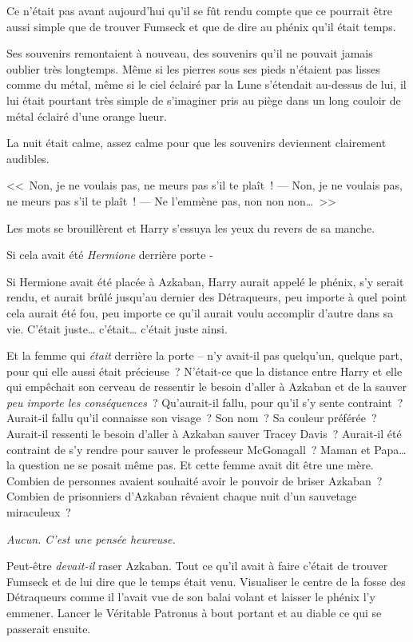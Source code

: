 Ce n'était pas avant aujourd'hui qu'il se fût rendu compte que ce pourrait être aussi simple que de trouver Fumseck et que de dire au phénix qu'il était temps.

Ses souvenirs remontaient à nouveau, des souvenirs qu'il ne pouvait jamais oublier très longtemps. Même si les pierres sous ses pieds n'étaient pas lisses comme du métal, même si le ciel éclairé par la Lune s'étendait au-dessus de lui, il lui était pourtant très simple de s'imaginer pris au piège dans un long couloir de métal éclairé d'une orange lueur.

La nuit était calme, assez calme pour que les souvenirs deviennent clairement audibles.

<<~Non, je ne voulais pas, ne meurs pas s'il te plaît~!
---  Non, je ne voulais pas, ne meurs pas s'il te plaît~!
---  Ne l'emmène pas, non non non…~>>

Les mots se brouillèrent et Harry s'essuya les yeux du revers de sa manche.

Si cela avait été \emph{Hermione} derrière porte -

Si Hermione avait été placée à Azkaban, Harry aurait appelé le phénix, s'y serait rendu, et aurait brûlé jusqu'au dernier des Détraqueurs, peu importe à quel point cela aurait été fou, peu importe ce qu'il aurait voulu accomplir d'autre dans sa vie. C'était juste… c'était… c'était juste ainsi.

Et la femme qui \emph{était} derrière la porte -- n'y avait-il pas quelqu'un, quelque part, pour qui elle aussi était précieuse~? N'était-ce que la distance entre Harry et elle qui empêchait son cerveau de ressentir le besoin d'aller à Azkaban et de la sauver \emph{peu importe les conséquences}~? Qu'aurait-il fallu, pour qu'il s'y sente contraint~? Aurait-il fallu qu'il connaisse son visage~? Son nom~? Sa couleur préférée~? Aurait-il ressenti le besoin d'aller à Azkaban sauver Tracey Davis~? Aurait-il été contraint de s'y rendre pour sauver le professeur McGonagall~? Maman et Papa… la question ne se posait même pas. Et cette femme avait dit être une mère. Combien de personnes avaient souhaité avoir le pouvoir de briser Azkaban~? Combien de prisonniers d'Azkaban rêvaient chaque nuit d'un sauvetage miraculeux~?

\emph{Aucun. C'est une pensée heureuse.}

Peut-être \emph{devait-il} raser Azkaban. Tout ce qu'il avait à faire c'était de trouver Fumseck et de lui dire que le temps était venu. Visualiser le centre de la fosse des Détraqueurs comme il l'avait vue de son balai volant et laisser le phénix l'y emmener. Lancer le Véritable Patronus à bout portant et au diable ce qui se passerait ensuite.

